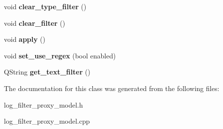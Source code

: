 \begin{DoxyCompactItemize}
\item 
\hypertarget{class_log__viewer_1_1_log__filter__proxy__model_ad56a9dcdb23173dbe40fbdd68c7a03b5}{void {\bfseries clear\-\_\-type\-\_\-filter} ()}\label{class_log__viewer_1_1_log__filter__proxy__model_ad56a9dcdb23173dbe40fbdd68c7a03b5}

\item 
\hypertarget{class_log__viewer_1_1_log__filter__proxy__model_adb482b98080b7ed6f9aa1f34b3a2be7f}{void {\bfseries clear\-\_\-filter} ()}\label{class_log__viewer_1_1_log__filter__proxy__model_adb482b98080b7ed6f9aa1f34b3a2be7f}

\item 
\hypertarget{class_log__viewer_1_1_log__filter__proxy__model_a14b4dfcceb4292d59633db8ba0b4281a}{void {\bfseries apply} ()}\label{class_log__viewer_1_1_log__filter__proxy__model_a14b4dfcceb4292d59633db8ba0b4281a}

\item 
\hypertarget{class_log__viewer_1_1_log__filter__proxy__model_a2ecf8154a48bef95af5048d06044c44a}{void {\bfseries set\-\_\-use\-\_\-regex} (bool enabled)}\label{class_log__viewer_1_1_log__filter__proxy__model_a2ecf8154a48bef95af5048d06044c44a}

\item 
\hypertarget{class_log__viewer_1_1_log__filter__proxy__model_a85b64917da78419d9ddef15feab2ed2e}{Q\-String {\bfseries get\-\_\-text\-\_\-filter} ()}\label{class_log__viewer_1_1_log__filter__proxy__model_a85b64917da78419d9ddef15feab2ed2e}

\end{DoxyCompactItemize}


The documentation for this class was generated from the following files\-:\begin{DoxyCompactItemize}
\item 
log\-\_\-filter\-\_\-proxy\-\_\-model.\-h\item 
log\-\_\-filter\-\_\-proxy\-\_\-model.\-cpp\end{DoxyCompactItemize}
